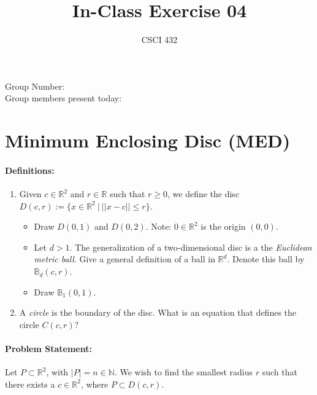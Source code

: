 \documentclass{article}
\title{In-Class Exercise 04}
\author{CSCI 432}
\def\R{{\mathbb R}}
\def\N{{\mathbb N}}
\begin{document}
\maketitle

\noindent
Group Number:\\
Group members present today:

\section*{Minimum Enclosing Disc (MED)}

\paragraph{Definitions:}

\begin{enumerate}
    \item Given $c \in \R^2$ and $r \in \R$ such that $r \geq 0$, we define the
        disc $D(c,r) := \{ x \in \R^2 ~|~ ||x-c|| \leq r \}$.
        \begin{itemize}
            \item Draw $D(0,1)$ and $D(0,2)$. Note: $0\in \R^2$ is the origin
                $(0,0)$.
                \vspace{3ex}
            \item Let $d>1$.  The generalization of a two-dimensional disc is a
                the \emph{Euclidean metric ball}.  Give a general definition of
                a ball in $\R^d$.  Denote this ball by $\mathbb{B}_d(c,r)$.
                \vspace{3ex}
            \item Draw $\mathbb{B}_1(0,1)$.
                \vspace{3ex}
        \end{itemize}
    \item A \emph{circle} is the boundary of the disc.  What is an equation that
        defines the circle $C(c,r)$?
                \vspace{3ex}
\end{enumerate}

\paragraph{Problem Statement:}

Let $P \subset \R^2$, with $|P|=n \in \N$.  We wish to find the smallest radius
$r$ such that there exists a $c \in \R^2$, where $P \subset D(c,r)$.
\end{document}
